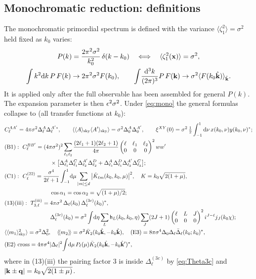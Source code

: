 \subsection{Monochromatic reduction: definitions}
\label{sec:monodef}
The monochromatic primordial spectrum is defined with the variance $\langle\zeta_1^2\rangle=\sigma^2$ held fixed as $k_0$ varies:
\begin{gather}
P(k)=\frac{2\pi^2\sigma^2}{k_0^2}\,\delta(k-k_0)\quad\Longleftrightarrow\quad\langle\zeta_1^2(\mathbf x)\rangle=\sigma^2,\nonumber\\
\int k^2\mathrm d k\,P\,F(k)\to2\pi^2\sigma^2F(k_0),\qquad\int\!\frac{\mathrm d^3k}{(2\pi)^3}P\,F(\mathbf k)\to\sigma^2\langle F(k_0\hat{\mathbf k})\rangle_{\hat{\mathbf k}}.
\label{eq:mono}
\end{gather}
It is applied only after the full observable has been assembled for general $P(k)$.  The expansion parameter is then $\epsilon^2\sigma^2$.
Under \eqref{eq:mono} the general formulas collapse to (all transfer functions at $k_0$):
\begin{align}
&C^{AA'}_\ell=4\pi\sigma^2\Delta^A_\ell\Delta^{A'*}_\ell,\qquad \langle\sky A\sky{A'}\rangle=\sigma^2\Delta^A_0\Delta^{A'}_0,\qquad
\xi^{XY}(0)=\sigma^2\,\tfrac12\int_{-1}^1\dd\nu\,x(k_0,\nu)y(k_0,\nu)^*;\nonumber\\
&\text{(B1)}:\ C^{BB'}_\ell=(4\pi\sigma^2)^2\sum_{\ell_1\ell_2}\frac{(2\ell_1+1)(2\ell_2+1)}{4\pi}\threej{\ell}{\ell_1}{\ell_2}{0}{0}{0}^2ww'\nonumber\\
&\hspace{8em}\times\big[\Delta^A_{\ell_1}\Delta^C_{\ell_1}\Delta^{A'}_{\ell_2}\Delta^D_{\ell_2}+\Delta^A_{\ell_1}\Delta^D_{\ell_1}\Delta^{A'}_{\ell_2}\Delta^C_{\ell_2}\big];\nonumber\\
&\text{(C1)}:\ C^{(22)}_\ell=\frac{\sigma^4}{2\ell+1}\int_{-1}^1\!\dd\mu\sum_{|m|\le d}\big|\tilde K_{\ell m}(k_0,k_0,\mu)\big|^2,\quad K=k_0\sqrt{2(1+\mu)},\nonumber\\
&\hspace{8em}\cos\alpha_1=\cos\alpha_2=\sqrt{(1+\mu)/2};\nonumber\\
&\text{(13)(iii)}:\ T^{\rm(iii)}_{3,\ell}=4\pi\sigma^2\,\Delta_\ell(k_0)\,\Delta^{(3c)}_\ell(k_0)^*,\nonumber\\
&\hspace{8em}\Delta^{(3c)}_\ell(k_0)=\sigma^2\int\!\dd\eta\sum_L\mathsf h_L(k_0,k_0,\eta)\sum_J(2J+1)\threej{\ell}{L}{J}{0}{0}{0}^2i^{J-\ell}j_J(k_0\chi);\nonumber\\
&\langle\sky{m_1}^2\rangle=\sigma^2\Delta_0^2,\quad \langle\!\langle m_2\rangle\!\rangle=\sigma^2\bar K_2(k_0\khat,-k_0\khat),\quad
\text{(E3)}=8\pi\sigma^4\Delta_0\Delta_\ell\bar\Delta_\ell(k_0;k_0)^*,\nonumber\\
&\text{(E2) cross}=4\pi\sigma^4|\Delta_\ell|^2\!\int\!\dd\mu\,P_\ell(\mu)\bar K_2(k_0\khat,-k_0\khat')^*,
\label{eq:mono_rules}
\end{align}
where in (13)(iii) the pairing factor 3 is inside $\Delta^{(3c)}_\ell$ by \eqref{eq:Theta3c} and $|\mathbf k\pm\mathbf q|=k_0\sqrt{2(1\pm\mu)}$.

